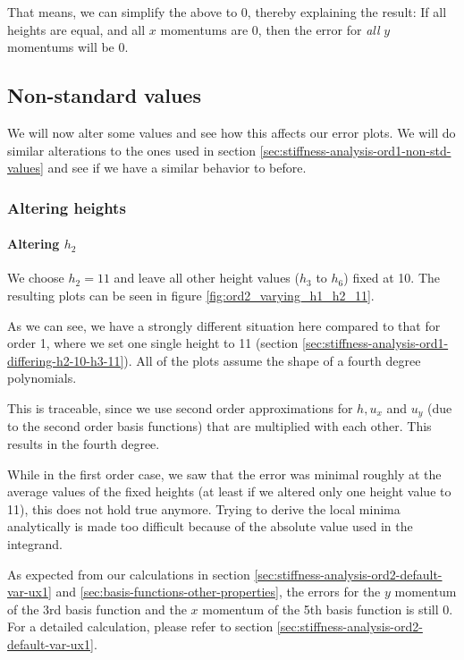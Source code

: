 \documentclass{article}
\begin{document}
That means, we can simplify the above to 0, thereby explaining the result: If all heights are equal, and all $x$ momentums are 0, then the error for \emph{all} $y$ momentums will be 0.

\subsection{Non-standard values}
\label{sec:stiffness-analysis-ord2-nondefault}

We will now alter some values and see how this affects our error plots. We will do similar alterations to the ones used in section \ref{sec:stiffness-analysis-ord1-non-std-values} and see if we have a similar behavior to before.

\subsubsection{Altering heights}
\label{sec:stiffness-analysis-ord2-nondefault-altering-heights}

\paragraph{\texorpdfstring{Altering $h_2$}{Altering h2}}

We choose $h_2=11$ and leave all other height values ($h_3$ to $h_6$) fixed at 10. The resulting plots can be seen in figure \ref{fig:ord2_varying_h1_h2_11}.



As we can see, we have a strongly different situation here compared to that for order 1, where we set one single height to 11 (section \ref{sec:stiffness-analysis-ord1-differing-h2-10-h3-11}). All of the plots assume the shape of a fourth degree polynomials.

This is traceable, since we use second order approximations for $h, u_x$ and $u_y$ (due to the second order basis functions) that are multiplied with each other. This results in the fourth degree.

While in the first order case, we saw that the error was minimal roughly at the average values of the fixed heights (at least if we altered only one height value to 11), this does not hold true anymore. Trying to derive the local minima analytically is made too difficult because of the absolute value used in the integrand.

As expected from our calculations in section \ref{sec:stiffness-analysis-ord2-default-var-ux1} and \ref{sec:basis-functions-other-properties}, the errors for the $y$ momentum of the 3rd basis function and the $x$ momentum of the 5th basis function is still 0. For a detailed calculation, please refer to section \ref{sec:stiffness-analysis-ord2-default-var-ux1}.
\end{document}
